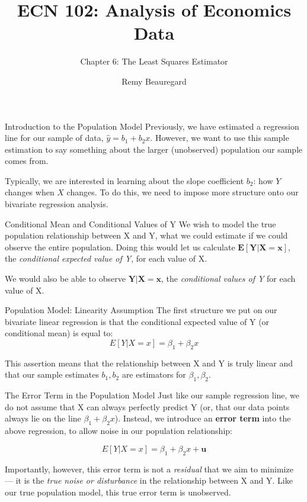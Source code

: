 \documentclass[
  ignorenonframetext,
  english,
]{beamer}
\title{\texorpdfstring{ECN 102: Analysis of Economics
Data}{ECN 102: Analysis of Economics Data}}
\subtitle{\texorpdfstring{Chapter 6: The Least Squares
Estimator}{Chapter 6: The Least Squares Estimator}}
\author{Remy Beauregard}
\date{}
\begin{document}
\frame{\titlepage}


\begin{frame}{Introduction to the Population Model}
\protect{}\label{introduction-to-the-population-model}
Previously, we have estimated a regression line for our sample of data,
\(\hat{y}=b_1+b_2x\). However, we want to use this sample estimation to
say something about the larger (unobserved) population our sample comes
from.

Typically, we are interested in learning about the slope coefficient
\(b_2\): how \(Y\) changes when \(X\) changes. To do this, we need to
impose more structure onto our bivariate regression analysis.
\end{frame}

\begin{frame}{Conditional Mean and Conditional Values of Y}
\protect{}\label{conditional-mean-and-conditional-values-of-y}
We wish to model the true population relationship between X and Y, what
we could estimate if we could observe the entire population. Doing this
would let us calculate \(\boldsymbol{E[Y|X=x]}\), the \emph{conditional
expected value of Y}, for each value of X.

We would also be able to observe \(\boldsymbol{Y|X=x}\), the
\emph{conditional values of Y} for each value of X.
\end{frame}

\begin{frame}{Population Model: Linearity Assumption}
\protect{}\label{population-model-linearity-assumption}
The first structure we put on our bivariate linear regression is that
the conditional expected value of Y (or conditional mean) is equal to:
\[E[Y|X=x] = \beta_1+\beta_2x\]

This assertion means that the relationship between X and Y is truly
linear and that our sample estimates \(b_1,b_2\) are estimators for
\(\beta_1,\beta_2\).
\end{frame}

\begin{frame}{The Error Term in the Population Model}
\protect{}\label{the-error-term-in-the-population-model}
Just like our sample regression line, we do not assume that X can always
perfectly predict Y (or, that our data points always lie on the line
\(\beta_1+\beta_2x\)). Instead, we introduce an \textbf{error term} into
the above regression, to allow noise in our population relationship:

\[E[Y|X=x]=\beta_1+\beta_2x+\boldsymbol{u}\]

Importantly, however, this error term is not a \emph{residual} that we
aim to minimize --- it is the \emph{true noise or disturbance} in the
relationship between X and Y. Like our true population model, this true
error term is unobserved.
\end{frame}
\end{document}
